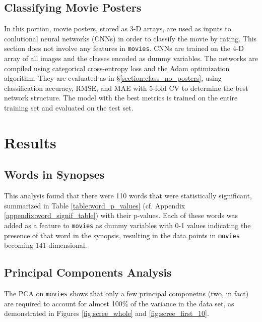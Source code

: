 \documentclass[12pt, oneside]{article}   	%
\begin{document}
\subsection{Classifying Movie Posters}
\label{section:class_posters}

In this portion, movie posters, stored as 3-D arrays, are used as inputs to conlutional neural networks (CNNs) in order to classify the movie by rating. This section does not involve any features in \texttt{movies}. CNNs are trained on the 4-D array of all images and the classes encoded as dummy variables. The networks are compiled using categorical cross-entropy loss and the Adam optimization algorithm. They are evaluated as in \S \ref{section:class_no_posters}, using classification accuracy, RMSE, and MAE with 5-fold CV to determine the best network structure. The model with the best metrics is trained on the entire training set and evaluated on the test set.

\newpage

\section{Results}

\subsection{Words in Synopses}
\label{section:words_results}

This analysis found that there were 110 words that were statistically significant, summarized in Table \ref{table:word_p_values} (cf. Appendix \ref{appendix:word_signif_table}) with their p-values. Each of these words was added as a feature to \texttt{movies} as dummy variables with 0-1 values indicating the presence of that word in the synopsis, resulting in the data points in \texttt{movies} becoming 141-dimensional.

\subsection{Principal Components Analysis}
\label{section:pca_results}

The PCA on \texttt{movies} shows that only a few principal componetns (two, in fact) are required to account for almost 100\% of the variance in the data set, as demonstrated in Figures \ref{fig:scree_whole} and \ref{fig:scree_first_10}.
\end{document}
